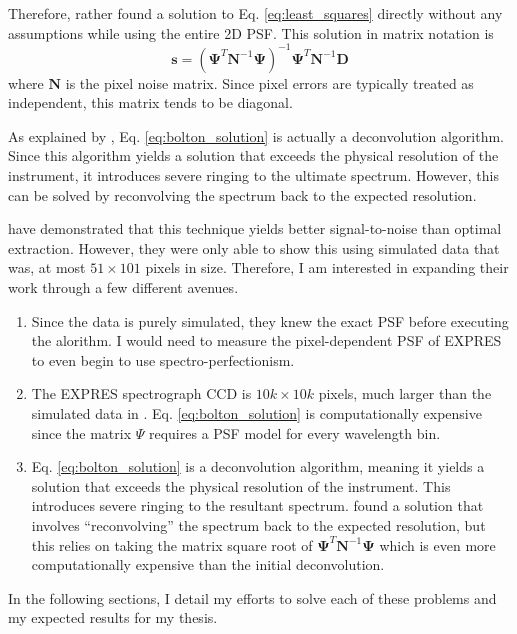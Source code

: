\documentclass[11pt]{article}
\begin{document}
Therefore, \citet{Bolton2009} rather found a solution to Eq. \ref{eq:least_squares} directly without any assumptions while using the entire 2D PSF. This solution in matrix notation is
\begin{equation}
    \textbf{s} = (\bm{\Psi}^T \bm{N}^{-1} \bm{\Psi})^{-1} \bm{\Psi}^T \bm{N}^{-1} \bm{D}
    \label{eq:bolton_solution}
\end{equation}
where $\bm{N}$ is the pixel noise matrix. Since pixel errors are typically treated as independent, this matrix tends to be diagonal.

As explained by \citet{Bolton2009}, Eq. \ref{eq:bolton_solution} is actually a deconvolution algorithm. Since this algorithm yields a solution that exceeds the physical resolution of the instrument, it introduces severe ringing to the ultimate spectrum. However, this can be solved by reconvolving the spectrum back to the expected resolution.

\citet{Bolton2009} have demonstrated that this technique yields better signal-to-noise than optimal extraction. However, they were only able to show this using simulated data that was, at most $51\times101$ pixels in size. Therefore, I am interested in expanding their work through a few different avenues.
\begin{enumerate}
    \item Since the \citet{Bolton2009} data is purely simulated, they knew the exact PSF before executing the alorithm. I would need to measure the pixel-dependent PSF of EXPRES to even begin to use spectro-perfectionism.
    \item The EXPRES spectrograph CCD is $10k \times 10k$ pixels, much larger than the simulated data in \citet{Bolton2009}. Eq. \ref{eq:bolton_solution} is computationally expensive since the matrix $\Psi$ requires a PSF model for every wavelength bin.
    \item Eq. \ref{eq:bolton_solution} is a deconvolution algorithm, meaning it yields a solution that exceeds the physical resolution of the instrument. This introduces severe ringing to the resultant spectrum. \citet{Bolton2009} found a solution that involves ``reconvolving'' the spectrum back to the expected resolution, but this relies on taking the matrix square root of $\bm{\Psi}^T \bm{N}^{-1} \bm{\Psi}$ which is even more computationally expensive than the initial deconvolution.
\end{enumerate}
In the following sections, I detail my efforts to solve each of these problems and my expected results for my thesis.
\end{document}

